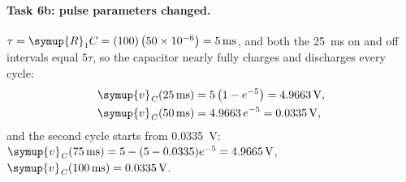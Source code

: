 \documentclass[12pt,a4paper]{article}
\begin{document}
	\paragraph{Task 6b: pulse parameters changed.}
	$\tau = \symup{R}_{1} C = (100)\left(50\times 10^{-6}\right) =
	\SI{5}{\milli\second}$, and both the \SI{25}{\milli\second} on and
	off intervals equal $5\tau$, so the capacitor nearly fully charges
	and discharges every cycle:
	\begin{align}
		\symup{v}_{\mathit{C}}(\SI{25}{\milli\second}) &= 5\left(1 - e^{-5}\right)
		= \SI{4.9663}{\volt},\\
		\symup{v}_{\mathit{C}}(\SI{50}{\milli\second}) &= 4.9663\, e^{-5} = \SI{0.0335}{\volt},
	\end{align}
	and the second cycle starts from \SI{0.0335}{\volt}:
	$\symup{v}_{\mathit{C}}(\SI{75}{\milli\second}) = 5 - (5 - 0.0335)e^{-5} =
	\SI{4.9665}{\volt}$, $\symup{v}_{\mathit{C}}(\SI{100}{\milli\second}) = \SI{0.0335}{\volt}$.
	
\end{document}
